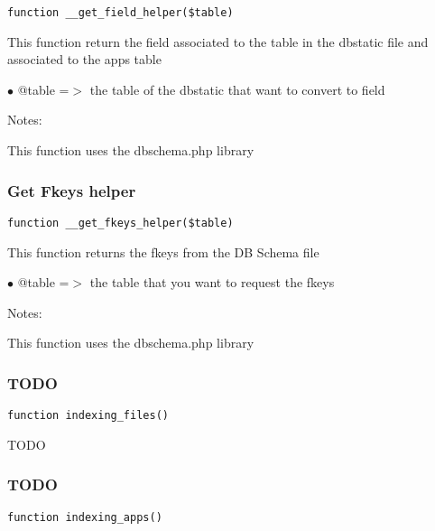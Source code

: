 \documentclass[a4paper]{article}
\begin{document}
\begin{lstlisting}
function __get_field_helper($table)
\end{lstlisting}

This function return the field associated to the table in the dbstatic
file and associated to the apps table

\begin{compactitem}
\item[\color{myblue}$\bullet$] @table =$>$ the table of the dbstatic that want to convert to field
\end{compactitem}

Notes:

This function uses the dbschema.php library

\hypertarget{toc485}{}
\subsubsection{Get Fkeys helper}

\begin{lstlisting}
function __get_fkeys_helper($table)
\end{lstlisting}

This function returns the fkeys from the DB Schema file

\begin{compactitem}
\item[\color{myblue}$\bullet$] @table =$>$ the table that you want to request the fkeys
\end{compactitem}

Notes:

This function uses the dbschema.php library

\hypertarget{toc486}{}
\subsubsection{TODO}

\begin{lstlisting}
function indexing_files()
\end{lstlisting}

TODO

\hypertarget{toc487}{}
\subsubsection{TODO}

\begin{lstlisting}
function indexing_apps()
\end{lstlisting}
\end{document}
